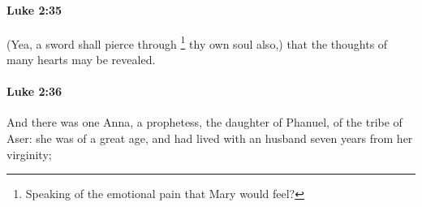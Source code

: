 		\paragraph{Luke 2:35} %
			\label{LUKE-2-35}

			(Yea, a sword shall pierce through%
				\footnote{%
					Speaking of the emotional pain that Mary would feel?
					}
			thy own soul also,) that the thoughts of many hearts may be revealed.

			\begin{framed}
			\scriptsize
				\begin{compactdesc}
					\item[SBLG] 
				\end{compactdesc}
			\end{framed}

		\paragraph{Luke 2:36} %
			\label{LUKE-2-36}

			And there was one Anna, a prophetess, the daughter of Phanuel, of the tribe of Aser: she was of a great age, and had lived with an husband seven years from her virginity;

